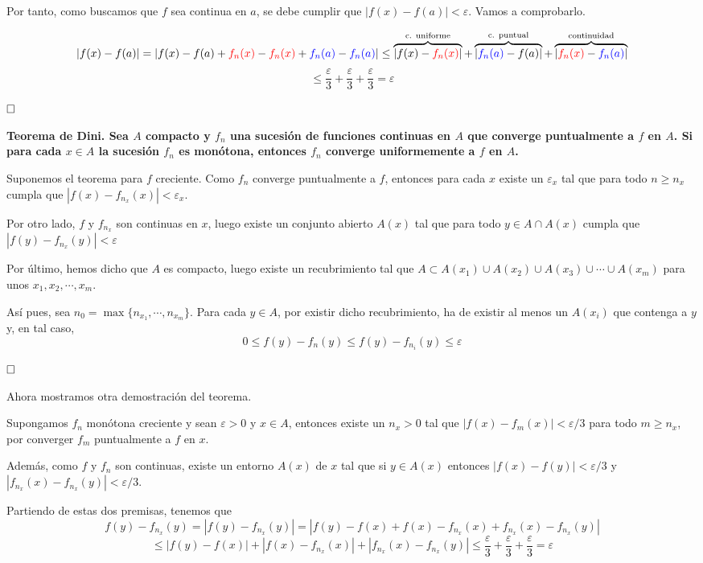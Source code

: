 \documentclass[a4paper]{article}
\newcommand{\qed}{\begin{flushright}
		{$\newline\square$}
	\end{flushright}}
\begin{document}
Por tanto, como buscamos que $f$ sea continua en $a$, se debe cumplir que $|f(x) - f(a)| < \varepsilon$. Vamos a comprobarlo.

$$|f(x) - f(a)| = |f(x) - f(a) +\textcolor{red}{f_n(x)}-\textcolor{red}{f_n(x)}+\textcolor{blue}{f_n(a)}-\textcolor{blue}{f_n(a)}| \le \overbrace{|f(x) - \textcolor{red}{f_n(x)}|}^{\text{c. uniforme}} + 
\overbrace{|\textcolor{blue}{f_n(a)} - f(a)|}^{\text{c. puntual}} +
\overbrace{|\textcolor{red}{f_n(x)} - \textcolor{blue}{f_n(a)}|}^{\text{continuidad}}$$$$\le 
\frac{\varepsilon}{3}+\frac{\varepsilon}{3}+\frac{\varepsilon}{3} = \varepsilon$$\qed

\textbf{Teorema de Dini. Sea $A$ compacto y $f_n$ una sucesión de funciones continuas en $A$ que converge puntualmente a $f$ en $A$. Si para cada $x\in A$ la sucesión $f_n$ es monótona, entonces $f_n$ converge uniformemente a $f$ en $A$.}

Suponemos el teorema para $f$ creciente. Como $f_n$ converge puntualmente a $f$, entonces para cada $x$ existe un $\varepsilon_x$ tal que para todo $n\ge n_x$ cumpla que $|f(x)-f_{n_x}(x)|<\varepsilon_x$.

Por otro lado, $f$ y $f_{n_x}$ son continuas en $x$, luego existe un conjunto abierto $A(x)$ tal que para todo $y\in A\cap A(x)$ cumpla que  $|f(y)-f_{n_x}(y)|<\varepsilon$

Por último, hemos dicho que $A$ es compacto, luego existe un recubrimiento tal que $A \subset A(x_1) \cup A(x_2) \cup A(x_3)\cup\cdots\cup A(x_m)$ para unos $x_1,x_2,\cdots,x_m$.

Así pues, sea $n_0 = \max\{n_{x_1}, \cdots, n_{x_m}\}$. Para cada $y\in A$, por existir dicho recubrimiento, ha de existir al menos un $A(x_i)$ que contenga a $y$ y, en tal caso, 
$$0 \le f(y) - f_n(y) \le f(y) - f_{n_i}(y) \le \varepsilon$$\qed

Ahora mostramos otra demostración del teorema.

Supongamos $f_n$ monótona creciente y sean $\varepsilon > 0$ y $x \in A$, entonces existe un $n_x > 0$ tal que $|f(x) - f_m(x)| < \varepsilon/3$ para todo $m \ge n_x$, por converger $f_m$ puntualmente a $f$ en $x$.

Además, como $f$ y $f_n$ son continuas, existe un entorno $A(x)$ de $x$ tal que si $y \in A(x)$ entonces $|f(x)-f(y)| < \varepsilon/3$ y $|f_{n_x}(x) - f_{n_x}(y)|<\varepsilon/3$.

Partiendo de estas dos premisas, tenemos que 
$$f(y) - f_{n_x}(y) = |f(y) - f_{n_x}(y)| = |f(y) -f(x)+f(x)-f_{n_x}(x)+f_{n_x}(x) - f_{n_x}(y)|$$$$\le  |f(y) -f(x)|+|f(x)-f_{n_x}(x)|+|f_{n_x}(x) - f_{n_x}(y)| \le \frac{\varepsilon}{3} + \frac{\varepsilon}{3} + \frac{\varepsilon}{3} = \varepsilon$$ 
\end{document}
